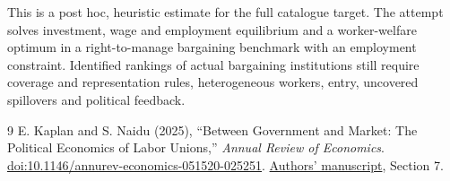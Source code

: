 \documentclass[11pt,a4paper]{article}
\theoremstyle{remark}
\begin{document}
This is a post hoc, heuristic estimate for the full catalogue target.
The attempt solves investment, wage and employment equilibrium and a worker-welfare optimum in a right-to-manage bargaining benchmark with an employment constraint. Identified rankings of actual bargaining institutions still require coverage and representation rules, heterogeneous workers, entry, uncovered spillovers and political feedback.

\begin{thebibliography}{9}
 E. Kaplan and S. Naidu (2025), ``Between Government and Market: The Political Economics of Labor Unions,'' \emph{Annual Review of Economics}. \href{https://doi.org/10.1146/annurev-economics-051520-025251}{doi:10.1146/annurev-economics-051520-025251}. \href{https://econweb.umd.edu/~kaplan/PE_of_Labor.pdf}{Authors' manuscript}, Section 7.
\end{thebibliography}
\end{document}
